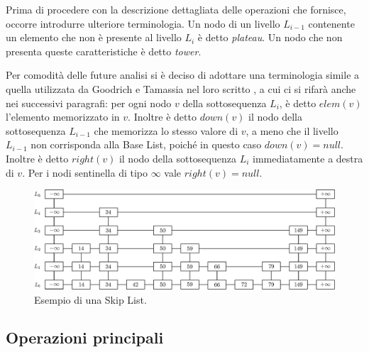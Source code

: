 	Prima di procedere con la descrizione dettagliata delle operazioni che fornisce, occorre introdurre ulteriore terminologia. Un nodo di un livello $ L_{i-1} $ contenente un elemento che non è presente al livello $ L_{i} $ è detto \textit{plateau}. Un nodo che non presenta queste caratteristiche è detto \textit{tower}. \cite{authskiplist}
	
	Per comodità delle future analisi si è deciso di adottare una terminologia simile a quella utilizzata da Goodrich e Tamassia nel loro scritto \cite{authskiplist}, a cui ci si rifarà anche nei successivi paragrafi: per ogni nodo $ v $ della sottosequenza $ L_{i} $, è detto $ elem(v) $ l'elemento memorizzato in $ v $. Inoltre è detto $ down(v) $ il nodo della sottosequenza $ L_{i-1} $ che memorizza lo stesso valore di $ v $, a meno che il livello $ L_{i-1} $ non corrisponda alla Base List, poiché in questo caso $ down(v) = null$.
	Inoltre è detto $ right(v) $ il nodo della sottosequenza $ L_{i} $ immediatamente a destra di $ v $. Per i nodi sentinella di tipo $\infty$ vale $ right(v) = null $.
		
	\begin{figure}
		\centering
		\includegraphics[scale=0.6]{figure/skiplist.eps}
		\caption{Esempio di una Skip List.}\label{fig:skiplist}
	\end{figure}
		
	\subsection{Operazioni principali}
	
%		



